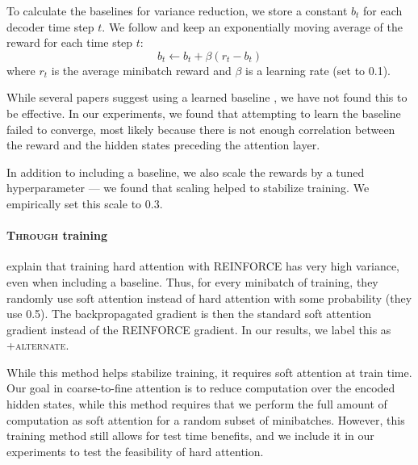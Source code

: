 \documentclass[12pt]{report}
\begin{document}
To calculate the baselines for variance reduction, we store a constant $b_t$ for each decoder time step $t$. We follow \citet{xu2015captioning} and keep an exponentially moving average of the reward for each time step $t$:
\begin{equation}
b_t \gets b_t + \beta (r_t - b_t)
\end{equation}
where $r_t$ is the average minibatch reward and $\beta$ is a learning rate (set to 0.1).

While several papers suggest using a learned baseline \citep[e.g.][]{mnih2014visualattention, ranzato2015}, we have not found this to be effective. In our experiments, we found that attempting to learn the baseline failed to converge, most likely because there is not enough correlation between the reward and the hidden states preceding the attention layer.

In addition to including a baseline, we also scale the rewards by a tuned hyperparameter --- we found that scaling helped to stabilize training. We empirically set this scale to 0.3.






\paragraph{\textsc{Through} training} \citet{xu2015captioning} explain that training hard attention with REINFORCE has very high variance, even when including a baseline. Thus, for every minibatch of training, they randomly use soft attention instead of hard attention with some probability (they use 0.5).
The backpropagated gradient is then the standard soft attention gradient instead of the REINFORCE gradient. In our results, we label this as \textsc{+alternate}.

While this method helps stabilize training, it requires soft attention at train time. Our goal in coarse-to-fine attention is to reduce computation over the encoded hidden states, while this method requires that we perform the full amount of computation as soft attention for a random subset of minibatches. However, this training method still allows for test time benefits, and we include it in our experiments to test the feasibility of hard attention.
\end{document}
